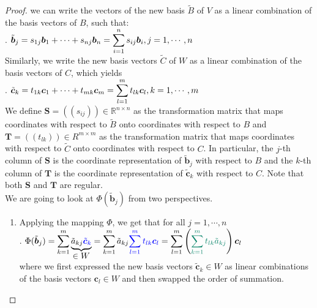 \begin{enumerate}
    \begin{proof}
        we can write the vectors of the new basis $\tilde{B}$ of $V$ as a linear combination of the basis vectors of $B$, such that:
        \hfill \cite{mfml/book/mml/Deisenroth-Faisal-Ong}
        \\
        .\hfill
        $
            \tilde{\bm{b}}_j 
            = s_{1j} \bm{b}_1 + \cdots + s_{nj} \bm{b}_n 
            = \displaystyle\sum^n _{i=1} s_{ij} \bm{b}_i 
            , j = 1, \cdots , n
        $
        \hfill \cite{mfml/book/mml/Deisenroth-Faisal-Ong}
        \\
        Similarly, we write the new basis vectors $\tilde{C}$ of $W$ as a linear combination of the basis vectors of $C$, which yields
        \hfill \cite{mfml/book/mml/Deisenroth-Faisal-Ong}
        \\
        .\hfill
        $
            \tilde{\bm{c}}_k 
            = t_{1k} \bm{c}_1 + \cdots + t_{mk} \bm{c}_m 
            = \displaystyle\sum^m _{l=1} t_{lk} \bm{c}_l 
            , k = 1, \cdots , m
        $
        \hfill \cite{mfml/book/mml/Deisenroth-Faisal-Ong}
        \\
        We define $\bm{S} = ((s_{ij} )) \in \mathbb{R}^{n\times n}$ as the transformation matrix that maps coordinates with respect to $\tilde{B}$ onto coordinates with respect to $B$ and $\bm{T} = ((t_{lk})) \in R^{m\times m}$ as the transformation matrix that maps coordinates with respect to $\tilde{C}$ onto coordinates with respect to $C$. 
        In particular, the $j$-th column of $\bm{S}$ is the coordinate representation of $\tilde{\bm{b}}_j$ with respect to $B$ and the $k$-th column of $\bm{T}$ is the coordinate representation of $\tilde{\bm{c}}_k$ with respect to $C$. 
        Note that both $\bm{S}$ and $\bm{T}$ are regular.
        \hfill \cite{mfml/book/mml/Deisenroth-Faisal-Ong}
        \\
        We are going to look at $\Phi(\tilde{\bm{b}}_j )$ from two perspectives.
        \hfill \cite{mfml/book/mml/Deisenroth-Faisal-Ong}
        \begin{enumerate}
            \item Applying the mapping $\Phi$, we get that for all $j = 1, \cdots , n$
            \hfill \cite{mfml/book/mml/Deisenroth-Faisal-Ong}
            \\
            .\hfill
            $
                \Phi(\tilde{\bm{b}}_j )
                = \dsum^m_{k=1} \underset{\displaystyle \in W}{
                    \underbrace{\tilde{a}_{kj} \textcolor{blue}{\tilde{\bm{c}}_k}}
                }
                = \dsum^m_{k=1} \tilde{a}_{kj} \textcolor{blue}{
                    \dsum^m_{l=1} t_{lk} \bm{c}_l
                }
                = \dsum^m_{l=1} \dParenBrac{
                    \textcolor{PineGreen}{\dsum^m_{k=1} t_{lk} \tilde{a}_{kj}} 
                }  \bm{c}_l
            $
            \hfill \cite{mfml/book/mml/Deisenroth-Faisal-Ong}
            \\
            where we first expressed the new basis vectors $\tilde{\bm{c}}_k \in W$ as linear combinations of the basis vectors $\bm{c}_l \in W$ and then swapped the order of summation.
            \hfill \cite{mfml/book/mml/Deisenroth-Faisal-Ong}
    

\end{enumerate}
\end{proof}
\end{enumerate}
